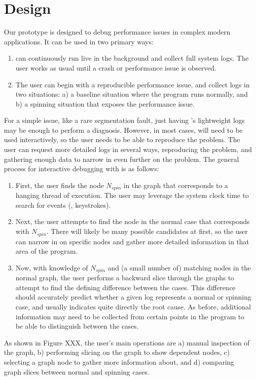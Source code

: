 \section{Design}
\label{sec:design}

Our \xxx prototype is designed to debug performance issues in complex modern applications.
It can be used in two primary ways:
\begin{enumerate}
    \item \xxx can continuously run live in the background and collect full
    system logs. The user works as usual until a crash or performance issue is
    observed.

    \item The user can begin with a reproducible performance issue, and collect
    logs in two situations: a) a baseline situation where the program runs
    normally, and b) a spinning situation that exposes the performance issue.

\end{enumerate}
For a simple issue, like a rare segmentation fault, just having \xxx's lightweight logs may be enough to perform a diagnosis.
However, in most cases, \xxx will need to be used interactively, so the user needs to be able to reproduce the problem.
The user can request more detailed logs in several ways, reproducing the problem, and gathering enough data to narrow in even further on the problem.
The general process for interactive debugging with \xxx is as follows:
\begin{enumerate}
    \item First, the user finds the node \emph{$N_{spin}$} in the \xxx graph
    that corresponds to a hanging thread of execution. The user may leverage
    the system clock time to search for events (\eg, keystrokes).

    \item Next, the user attempts to find the node in the normal case that
    corresponds with $N_{spin}$. There will likely be many possible candidates
    at first, so the user can narrow in on specific nodes and gather more
    detailed information in that area of the program.

    \item Now, with knowledge of $N_{spin}$ and (a small number of) matching
    nodes in the normal graph, the user performs a backward slice through the
    graphs to attempt to find the defining difference between the cases. This
    difference should accurately predict whether a given log represents a
    normal or spinning case, and usually indicates quite directly the root
    cause. As before, additional information may need to be collected from
    certain points in the program to be able to distinguish between the cases.

\end{enumerate}
As shown in Figure XXX, the user's main operations are a) manual inspection of
the graph, b) performing slicing on the graph to show dependent nodes, c)
selecting a graph node to gather more information about, and d) comparing graph
slices between normal and spinning cases.

